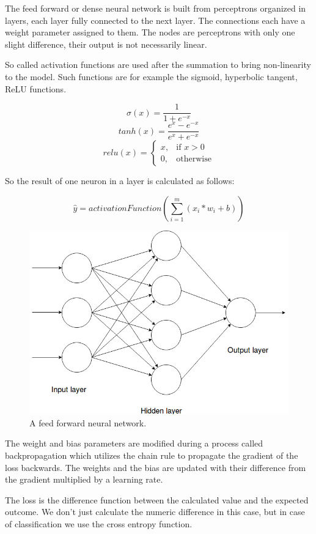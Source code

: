 The feed forward or dense neural network is built from perceptrons organized in layers, each layer fully connected to the next layer. The connections each have a weight parameter assigned to them. The nodes are perceptrons with only one slight difference, their output is not necessarily linear.

So called activation functions are used after the summation to bring non-linearity to the model. Such functions are for example the sigmoid, hyperbolic tangent, ReLU functions.

\[\sigma(x) = \frac{1}{1 + e^{-x}}\]
\[tanh(x) = \frac{e^x - e^{-x}}{e^x + e^{-x}}\]
\[relu(x) = \begin{cases}
	x, & \text{if } x > 0\\
	0, & \text{otherwise}
\end{cases}\]

So the result of one neuron in a layer is calculated as follows:

\[\hat{y} = activationFunction(\sum_{i=1}^{m}(x_i * w_i + b))\]

\begin{figure}[!ht]
	\centering
	\includegraphics[width=125mm, keepaspectratio]{figures/feed_forward_neural_network.jpg}
	\caption{A feed forward neural network.}
	\label{fig:feed_forward}
\end{figure}

The weight and bias parameters are modified during a process called backpropagation which utilizes the chain rule to propagate the gradient of the loss backwards. The weights and the bias are updated with their difference from the gradient multiplied by a learning rate.

The loss is the difference function between the calculated value and the expected outcome. We don't just calculate the numeric difference in this case, but in case of classification we use the cross entropy function.

